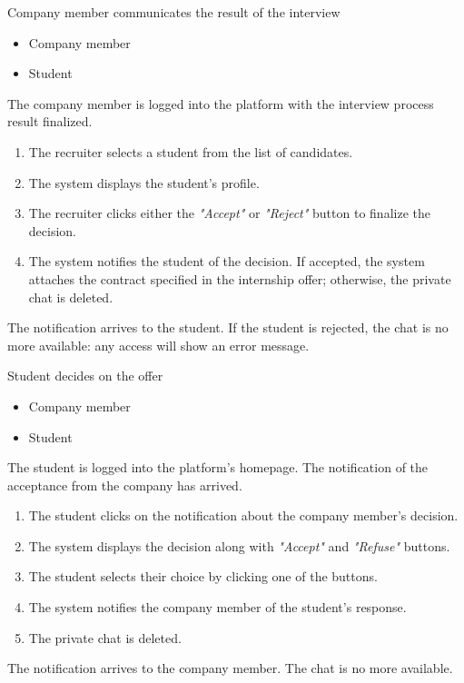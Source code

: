 \usecase
{Company member communicates the result of the interview}
{\begin{itemize}
    \item Company member
    \item Student
\end{itemize}}
{The company member is logged into the platform with the interview process result finalized.}
{
    \begin{enumerate}
        \item The recruiter selects a student from the list of candidates.
        \item The system displays the student's profile.
        \item The recruiter clicks either the \textit{"Accept"} or \textit{"Reject"} button to finalize the decision.
        \item The system notifies the student of the decision. If accepted, the system attaches the contract specified in the internship offer; otherwise, the private chat is deleted.
    \end{enumerate}
}
{The notification arrives to the student. If the student is rejected, the chat is no more available: any access will show an error message.}
{}
{}

\usecase
{Student decides on the offer}
{\begin{itemize}
    \item Company member
    \item Student
\end{itemize}}
{
    The student is logged into the platform's homepage. The notification of the acceptance from the company has arrived.
}
{
    \begin{enumerate}
        \item The student clicks on the notification about the company member's decision.
        \item The system displays the decision along with \textit{"Accept"} and \textit{"Refuse"} buttons.
        \item The student selects their choice by clicking one of the buttons.
        \item The system notifies the company member of the student's response. 
        \item The private chat is deleted.
    \end{enumerate}
}
{The notification arrives to the company member. The chat is no more available.}
{}
{}

